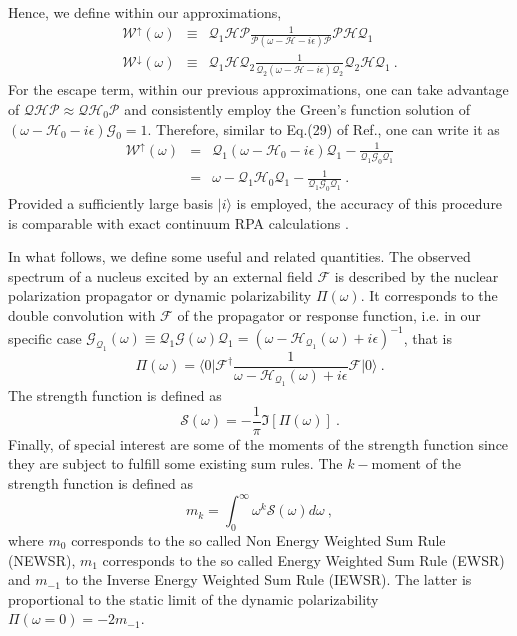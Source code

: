 \documentclass[12pt,a4paper,final]{iopart}
\begin{document}
Hence, we define within our approximations,      
\begin{eqnarray}
\mathcal{W}^\uparrow(\omega) &\equiv& \mathcal{Q}_1\mathcal{H}\mathcal{P}\frac{1}{\mathcal{P}(\omega-\mathcal{H}-i\epsilon)\mathcal{P}}\mathcal{P}\mathcal{H}\mathcal{Q}_1 
\label{dw} 
\\
\mathcal{W}^\downarrow(\omega) &\equiv& \mathcal{Q}_1\mathcal{H}\mathcal{Q}_2\frac{1}{\mathcal{Q}_2(\omega-\mathcal{H}-i\epsilon)\mathcal{Q}_2}\mathcal{Q}_2\mathcal{H}\mathcal{Q}_1 \ .  
\label{sw}
\end{eqnarray}
For the escape term, within our previous approximations, one can take advantage of $\mathcal{Q}\mathcal{H}\mathcal{P}\approx\mathcal{Q}\mathcal{H}_0\mathcal{P}$ and consistently employ the Green's function solution of $(\omega-\mathcal{H}_0-i\epsilon)\mathcal{G}_0 = 1$. Therefore, similar to Eq.(29) of Ref.\cite{yoshida1983}, one can write it as
\begin{eqnarray}
\mathcal{W}^\uparrow(\omega) &=& \mathcal{Q}_1(\omega-\mathcal{H}_0-i\epsilon)\mathcal{Q}_1 -\frac{1}{\mathcal{Q}_1\mathcal{G}_0\mathcal{Q}_1} \nonumber\\
&=& \omega - \mathcal{Q}_1\mathcal{H}_0\mathcal{Q}_1 -\frac{1}{\mathcal{Q}_1\mathcal{G}_0\mathcal{Q}_1} \ .
\end{eqnarray}
Provided a sufficiently large basis $\vert i\rangle$ is employed, the accuracy of this procedure is comparable with exact continuum RPA calculations \cite{giai1987}. 

In what follows, we define some useful and related quantities. The observed spectrum of a nucleus excited by an external field $\mathcal{F}$ is described by the nuclear polarization propagator or dynamic polarizability $\Pi(\omega)$. It corresponds to the double convolution with $\mathcal{F}$ of the propagator or response function, i.e. in our specific case $\mathcal{G}_{\mathcal{Q}_1}(\omega)\equiv\mathcal{Q}_1\mathcal{G}(\omega)\mathcal{Q}_1=(\omega-\mathcal{H}_{\mathcal{Q}_1}(\omega)+i\epsilon)^{-1}$, that is
\begin{equation}
\Pi(\omega) = \langle 0\vert \mathcal{F}^\dag\frac{1}{\omega-\mathcal{H}_{\mathcal{Q}_1}(\omega)+i\epsilon}\mathcal{F}\vert 0\rangle \ .
\label{resp}
\end{equation}
The strength function is defined as 
\begin{equation}
\mathcal{S}(\omega) = -\frac{1}{\pi}\Im\left[\Pi(\omega)\right] \ . 
\end{equation}
Finally, of special interest are some of the moments of the strength function since they are subject to fulfill some existing sum rules. The $k-$moment of the strength function is defined as
\begin{equation}
m_k=\int_0^\infty \omega^{k} \mathcal{S}(\omega) d\omega \ ,
\end{equation}
where $m_0$ corresponds to the so called Non Energy Weighted Sum Rule (NEWSR), $m_1$ corresponds to the so called Energy Weighted Sum Rule (EWSR) and $m_{-1}$ to the Inverse Energy Weighted Sum Rule (IEWSR). The latter is proportional to the static limit of the dynamic polarizability $\Pi(\omega=0)=-2m_{-1}$.  
\end{document}
